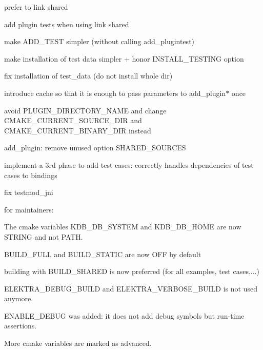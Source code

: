 \begin{DoxyItemize}
\item prefer to link shared
\item add plugin tests when using link shared
\item make A\+D\+D\+\_\+\+T\+E\+ST simpler (without calling add\+\_\+plugintest)
\item make installation of test data simpler + honor I\+N\+S\+T\+A\+L\+L\+\_\+\+T\+E\+S\+T\+I\+NG option
\item fix installation of test\+\_\+data (do not install whole dir)
\item introduce cache so that it is enough to pass parameters to {\ttfamily add\+\_\+plugin$\ast$} once
\item avoid P\+L\+U\+G\+I\+N\+\_\+\+D\+I\+R\+E\+C\+T\+O\+R\+Y\+\_\+\+N\+A\+ME and change C\+M\+A\+K\+E\+\_\+\+C\+U\+R\+R\+E\+N\+T\+\_\+\+S\+O\+U\+R\+C\+E\+\_\+\+D\+IR and C\+M\+A\+K\+E\+\_\+\+C\+U\+R\+R\+E\+N\+T\+\_\+\+B\+I\+N\+A\+R\+Y\+\_\+\+D\+IR instead
\item add\+\_\+plugin\+: remove unused option S\+H\+A\+R\+E\+D\+\_\+\+S\+O\+U\+R\+C\+ES
\item implement a 3rd phase to add test cases\+: correctly handles dependencies of test cases to bindings
\item fix testmod\+\_\+jni
\end{DoxyItemize}

for maintainers\+:


\begin{DoxyItemize}
\item The cmake variables K\+D\+B\+\_\+\+D\+B\+\_\+\+S\+Y\+S\+T\+EM and K\+D\+B\+\_\+\+D\+B\+\_\+\+H\+O\+ME are now S\+T\+R\+I\+NG and not P\+A\+TH.
\item B\+U\+I\+L\+D\+\_\+\+F\+U\+LL and B\+U\+I\+L\+D\+\_\+\+S\+T\+A\+T\+IC are now O\+FF by default
\item building with B\+U\+I\+L\+D\+\_\+\+S\+H\+A\+R\+ED is now preferred (for all examples, test cases,...)
\item E\+L\+E\+K\+T\+R\+A\+\_\+\+D\+E\+B\+U\+G\+\_\+\+B\+U\+I\+LD and E\+L\+E\+K\+T\+R\+A\+\_\+\+V\+E\+R\+B\+O\+S\+E\+\_\+\+B\+U\+I\+LD is not used anymore.
\item E\+N\+A\+B\+L\+E\+\_\+\+D\+E\+B\+UG was added\+: it does not add debug symbols but run-\/time assertions.
\item More cmake variables are marked as advanced.
\end{DoxyItemize}

